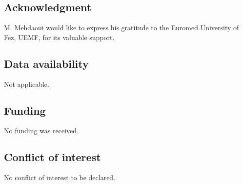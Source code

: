 \documentclass[10pt,number,preprint,times]{elsarticle}
\numberwithin{equation}{section} %
\begin{document}
	\subsection*{Acknowledgment}
	M. Mehdaoui would like to express his gratitude to the Euromed University of Fez, UEMF, for its valuable support.
	\subsection*{Data availability}
	Not applicable.
	\subsection*{Funding}
	No funding was received.
	\subsection*{Conflict of interest}
	No conflict of interest to be declared.
	
		
\end{document}
